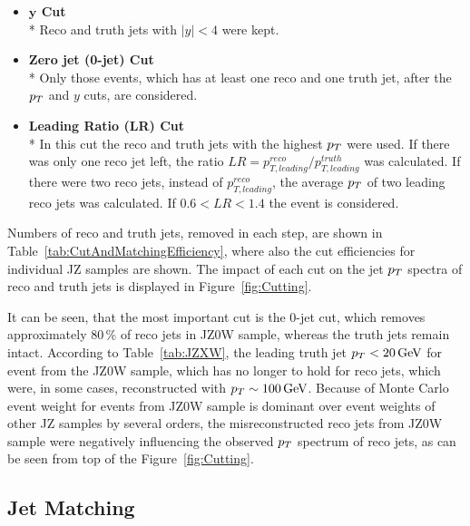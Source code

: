 \begin{itemize}

  \item \textbf{$\mathbf{y}$ Cut}
  \\*
    Reco and truth jets with $|y| < 4$ were kept.

  \item \textbf{Zero jet (0-jet) Cut}
  \\*
    Only those events, which has at least one reco and one truth jet, after the
    $p_{T}$ and $y$ cuts, are considered.
    
  \item \textbf{Leading Ratio (LR) Cut}
  \\*
    In this cut the reco and truth jets with the highest $p_{T}$ were used. If
    there was only one reco jet left, the ratio $LR = p_{T,leading}^{reco} /
    p_{T,leading}^{truth}$ was calculated. If there were two reco jets, instead
    of $p_{T,leading}^{reco}$, the average $p_{T}$ of two leading reco jets was
    calculated. If $0.6 < LR < 1.4$ the event is considered.

\end{itemize}

Numbers of reco and truth jets, removed in each step, are shown in
Table~\ref{tab:CutAndMatchingEfficiency}, where also the cut efficiencies for
individual JZ samples are shown. The impact of each cut on the jet $p_{T}$ spectra
of reco and truth jets is displayed in Figure~\ref{fig:Cutting}. 

It can be seen, that the most important cut is the 0-jet cut, which removes
approximately $80\,\%$ of reco jets in JZ0W sample, whereas the truth jets
remain intact. According to Table~\ref{tab:JZXW}, the leading truth jet $p_{T} <
20 \,\text{GeV}$ for event from the JZ0W sample, which has no longer to hold for reco
jets, which were, in some cases, reconstructed with $p_{T} \sim 100 \,\text{GeV}$. Because
of Monte Carlo event weight for events from JZ0W sample is dominant over event
weights of other JZ samples by several orders, the misreconstructed reco jets
from JZ0W sample were negatively influencing the observed $p_{T}$ spectrum of reco
jets, as can be seen from top of the Figure~\ref{fig:Cutting}.

\subsection{Jet Matching}
\label{SubSec:JetMatching}


